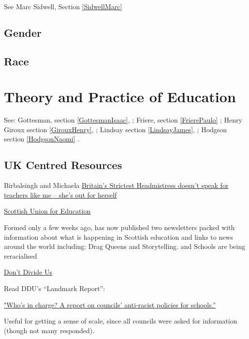 \documentclass[10pt,titlepage]{book}
\begin{document}
See Marc Sidwell, Section \ref{SidwellMarc}

\subsection{Gender}

\subsection{Race}

\section{Theory and Practice of Education}

See: Gottesman, section \ref{GottesmanIsaac}, \cite{gottesman-criturn}; Friere, section \ref{FrierePaulo}  \cite{friere-poled}; Henry Giroux section \ref{GirouxHenry}, \cite{giroux-critped}; Lindsay section \ref{LindsayJames}, \cite{lindsay-marxedu}; Hodgson section \ref{HodgsonNaomi} \cite{hodgson2020post}.

\subsection{UK Centred Resources}

Birbalsingh and Michaela
\href{https://www.independent.co.uk/voices/katharine-birbalsingh-britains-strictest-headmistress-teachers-b2085056.html}{Britain’s Strictest Headmistress doesn’t speak for teachers like me – she’s out for herself}

\href{https://scottishunionforeducation.substack.com}{Scottish Union for Education}

Formed only a few weeks ago, has now published two newsletters packed with information about what is happening in Scottish education
and links to news around the world including: Drag Queens and Storytelling. and Schools are being reracialised

\href{https://dontdivideus.com}{Don’t Divide Us}

Read DDU's ``Landmark Report'':

\href{https://dontdivideus.com/news/62cd9350ade8a40009b4c118/new-ddu-launch-landmark-report-whos-in-charge-a-report-on-councils-anti-racist-policies-for-schools}{"Who's in charge? A report on councils' anti-racist policies for schools.”}

Useful for getting a sense of scale, since all councils were asked for information (though not many responded).
\end{document}
